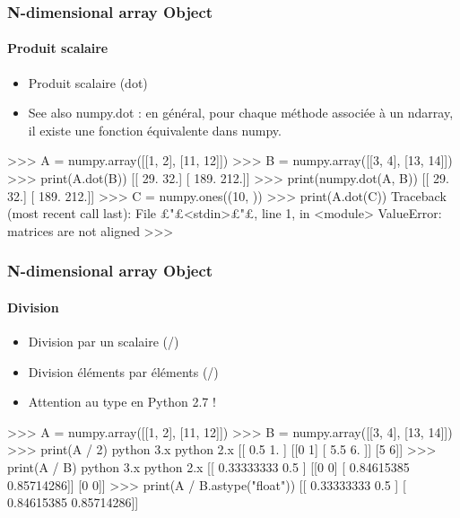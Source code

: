 \begin{frame}[fragile]
\frametitle{N-dimensional array Object}
\framesubtitle{Produit scalaire}
\begin{itemize}
 \item Produit scalaire (dot)
 \item See also numpy.dot : en général, pour chaque méthode associée à un ndarray, il existe une fonction équivalente dans numpy. 
\end{itemize}
\begin{pythonConsole}
>>> A = numpy.array([[1, 2], [11, 12]])
>>> B = numpy.array([[3, 4], [13, 14]])
>>> print(A.dot(B))
[[  29.   32.]
 [ 189.  212.]]
>>> print(numpy.dot(A, B))
[[  29.   32.]
 [ 189.  212.]]
>>> C = numpy.ones((10, ))
>>> print(A.dot(C))
Traceback (most recent call last):
  File £"£<stdin>£"£, line 1, in <module>
ValueError: matrices are not aligned
>>> 
\end{pythonConsole}
\end{frame}
\begin{frame}[fragile]
\frametitle{N-dimensional array Object}
\framesubtitle{Division}
\begin{itemize}
 \item Division par un scalaire (/)
 \item Division éléments par éléments (/) 
 \item Attention au type en Python 2.7 ! 
\end{itemize}
\begin{pythonConsole}
>>> A = numpy.array([[1, 2], [11, 12]])
>>> B = numpy.array([[3, 4], [13, 14]])
>>> print(A / 2)
python 3.x                      python 2.x
[[ 0.5  1. ]				    [[0 1]
 [ 5.5  6. ]] 				     [5 6]]
>>> print(A / B)
python 3.x                      python 2.x  
[[ 0.33333333  0.5       ]      [[0 0]
 [ 0.84615385  0.85714286]]      [0 0]]
>>> print(A / B.astype("float"))
[[ 0.33333333  0.5       ]
 [ 0.84615385  0.85714286]]
\end{pythonConsole}
\end{frame}
